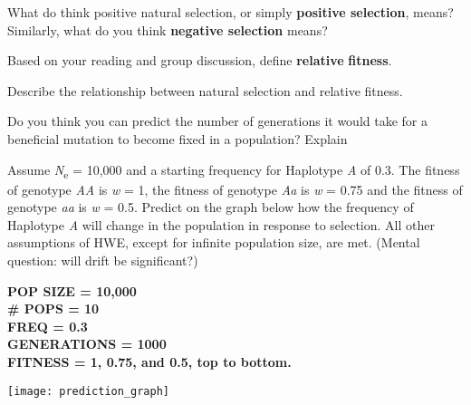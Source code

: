 \documentclass[11pt, addpoints]{exam}
\begin{document}
\begin{questions}

\question[1]
What do think positive natural selection, or simply
\textbf{positive selection}, means? Similarly, what do you think
\textbf{negative selection} means?

\question[1]
Based on your reading and group discussion, define
\textbf{relative} \textbf{fitness}.

\question[1]
Describe the relationship between natural selection and
relative fitness.

\question[1]
Do you think you can predict the number of generations it would take for a beneficial mutation to become fixed in a population? Explain

\newpage

\question
Assume \emph{N}\textsubscript{e} = 10,000 and a starting
frequency for Haplotype \emph{A} of 0.3. The fitness of genotype
\emph{AA} is \emph{w} = 1, the fitness of genotype \emph{Aa} is \emph{w}
= 0.75 and the fitness of genotype \emph{aa} is \emph{w} = 0.5. Predict
on the graph below how the frequency of Haplotype \emph{A} will change
in the population in response to selection. All other assumptions of
HWE, except for infinite population size, are met. (Mental question:
will drift be significant?)

\ifprintanswers
	{\bfseries %
	POP SIZE = 10,000\\
	\# POPS = 10\\
	FREQ = 0.3\\
	GENERATIONS = 1000\\	
	FITNESS = 1, 0.75, and 0.5, top to bottom. }\vspace*{16\baselineskip}
\else
	\begin{center}
		\texttt{[image: prediction\_graph]}
	\end{center}
\fi


\end{questions}
\end{document}
